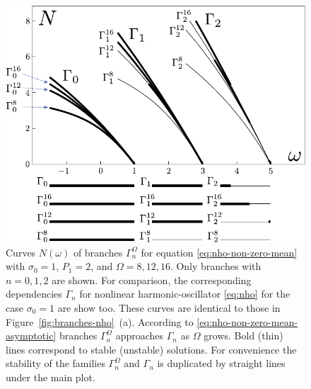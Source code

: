 \begin{figure}[h]
\centering
	\includegraphics[scale = 1]{pic/branches with linear counterpart, non-zero mean cosine nho}
	\caption{
		Curves $N(\omega)$ of branches $\Gamma_n^{\Omega}$ for equation \eqref{eq:nho-non-zero-mean} with $\sigma_0 = 1$, $P_1 = 2$, and $\Omega = 8, 12, 16$.
		Only branches with $n = 0, 1, 2$ are shown.
		For comparison, the corresponding dependencies $\Gamma_n$ for nonlinear harmonic-oscillator \eqref{eq:nho} for the case $\sigma_0 = 1$ are show too.
		These curves are identical to those in Figure~\ref{fig:branches-nho}~(a).
		According to \eqref{eq:nho-non-zero-mean-asymptotic} branches $\Gamma_n^{\Omega}$ approaches $\Gamma_n$ as $\Omega$ grows.
		Bold (thin) lines correspond to stable (unstable) solutions.
		For convenience the stability of the families $\Gamma_n^{\Omega}$ and $\Gamma_n$ is duplicated by straight lines under the main plot.
	}
\label{fig:branches-with-linear-counterpart-non-zero-mean}
\end{figure}

